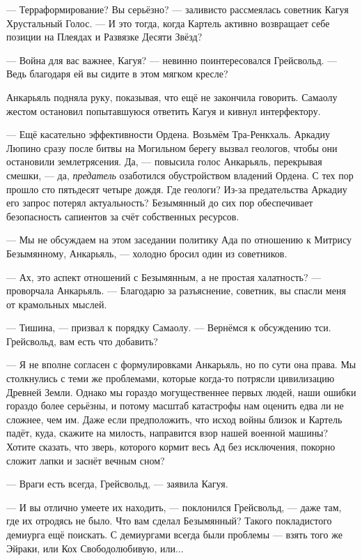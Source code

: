--- Терраформирование?
Вы серьёзно? --- заливисто рассмеялась советник Кагуя Хрустальный Голос.
--- И это тогда, когда Картель активно возвращает себе позиции на Плеядах и Развязке Десяти Звёзд?

--- Война для вас важнее, Кагуя? --- невинно поинтересовался Грейсвольд.
--- Ведь благодаря ей вы сидите в этом мягком кресле?

Анкарьяль подняла руку, показывая, что ещё не закончила говорить.
Самаолу жестом остановил попытавшуюся ответить Кагуя и кивнул интерфектору.

--- Ещё касательно эффективности Ордена.
Возьмём Тра-Ренкхаль.
Аркадиу Люпино сразу после битвы на Могильном берегу вызвал геологов, чтобы они остановили землетрясения.
Да, --- повысила голос Анкарьяль, перекрывая смешки, --- да, \emph{предатель} озаботился обустройством владений Ордена.
С тех пор прошло сто пятьдесят четыре дождя.
Где геологи?
Из-за предательства Аркадиу его запрос потерял актуальность?
Безымянный до сих пор обеспечивает безопасность сапиентов за счёт собственных ресурсов.

--- Мы не обсуждаем на этом заседании политику Ада по отношению к Митрису Безымянному, Анкарьяль, --- холодно бросил один из советников.

--- Ах, это аспект отношений с Безымянным, а не простая халатность? --- проворчала Анкарьяль.
--- Благодарю за разъяснение, советник, вы спасли меня от крамольных мыслей.

--- Тишина, --- призвал к порядку Самаолу.
--- Вернёмся к обсуждению тси.
Грейсвольд, вам есть что добавить?

--- Я не вполне согласен с формулировками Анкарьяль, но по сути она права.
Мы столкнулись с теми же проблемами, которые когда-то потрясли цивилизацию Древней Земли.
Однако мы гораздо могущественнее первых людей, наши ошибки гораздо более серьёзны, и потому масштаб катастрофы нам оценить едва ли не сложнее, чем им.
Даже если предположить, что исход войны близок и Картель падёт, куда, скажите на милость, направится взор нашей военной машины?
Хотите сказать, что зверь, которого кормит весь Ад без исключения, покорно сложит лапки и заснёт вечным сном?

--- Враги есть всегда, Грейсвольд, --- заявила Кагуя.

--- И вы отлично умеете их находить, --- поклонился Грейсвольд, --- даже там, где их отродясь не было.
Что вам сделал Безымянный?
Такого покладистого демиурга ещё поискать.
С демиургами всегда были проблемы --- взять того же Эйраки, или Кох Свободолюбивую, или...

